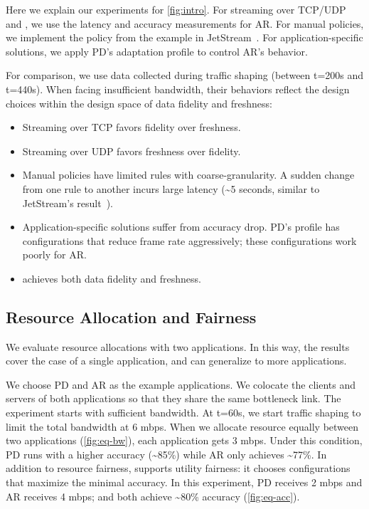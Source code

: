  Here we explain our experiments for
\autoref{fig:intro}. For streaming over TCP/UDP and \sysname{}, we use the
latency and accuracy measurements for AR\@. For manual policies, we implement the
policy from the example in JetStream~\cite{rabkin2014aggregation}. For
application-specific solutions, we apply PD's adaptation profile to control AR's
behavior.

For comparison, we use data collected during traffic shaping (between t=200s and
t=440s). When facing insufficient bandwidth, their behaviors reflect
the design choices within the design space of data fidelity and freshness:

\begin{itemize}[leftmargin=*]
\item Streaming over TCP favors fidelity over freshness.
\item Streaming over UDP favors freshness over fidelity.
\item Manual policies have limited rules with coarse-granularity. A sudden
  change from one rule to another incurs large latency (\textasciitilde 5
  seconds, similar to JetStream's result~\cite{rabkin2014aggregation}).
\item Application-specific solutions suffer from accuracy drop. PD's profile has
  configurations that reduce frame rate aggressively; these configurations work
  poorly for AR\@.
\item \sysname{} achieves both data fidelity and freshness.
\end{itemize}

\subsection{Resource Allocation and Fairness}
\label{sec:multi-task-alloc}

We evaluate resource allocations with two applications. In this way, the results
cover the case of a single application, and can generalize to more applications.

We choose PD and AR as the example applications.
We colocate the clients and servers of both applications so that they
share the same bottleneck link. The experiment starts with sufficient
bandwidth. At t=60s, we start traffic shaping to limit the total bandwidth
at 6 mbps. When we allocate resource equally between two applications
(\autoref{fig:eq-bw}), each application gets 3 mbps. Under this condition,
PD runs with a higher accuracy (\textasciitilde 85\%) while AR only achieves
\textasciitilde 77\%. In addition to resource fairness, \sysname{} supports utility fairness: it
chooses configurations that maximize the minimal accuracy. In this experiment,
PD receives 2 mbps and AR receives 4 mbps; and both achieve \textasciitilde 80\%
accuracy (\autoref{fig:eq-acc}).

